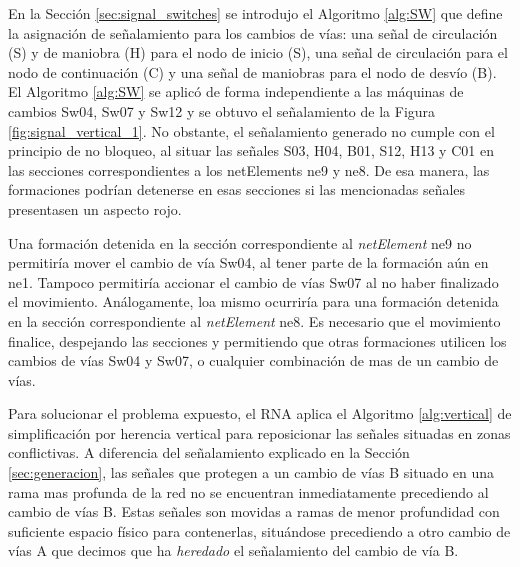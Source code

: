 	En la Sección \ref{sec:signal_switches} se introdujo el Algoritmo \ref{alg:SW} que define la asignación de señalamiento para los cambios de vías: una señal de circulación (S) y de maniobra (H) para el nodo de inicio (S), una señal de circulación para el nodo de continuación (C) y una señal de maniobras para el nodo de desvío (B). El Algoritmo \ref{alg:SW} se aplicó de forma independiente a las máquinas de cambios Sw04, Sw07 y Sw12 y se obtuvo el señalamiento de la Figura \ref{fig:signal_vertical_1}. No obstante, el señalamiento generado no cumple con el principio de no bloqueo, al situar las señales S03, H04, B01, S12, H13 y C01 en las secciones correspondientes a los netElements ne9 y ne8. De esa manera, las formaciones podrían detenerse en esas secciones si las mencionadas señales presentasen un aspecto rojo.
	
	Una formación detenida en la sección correspondiente al \textit{netElement} ne9 no permitiría mover el cambio de vía Sw04, al tener parte de la formación aún en ne1. Tampoco permitiría accionar el cambio de vías Sw07 al no haber finalizado el movimiento. Análogamente, loa mismo ocurriría para una formación detenida en la sección correspondiente al \textit{netElement} ne8. Es necesario que el movimiento finalice, despejando las secciones y permitiendo que otras formaciones utilicen los cambios de vías Sw04 y Sw07, o cualquier combinación de mas de un cambio de vías.
	
	Para solucionar el problema expuesto, el RNA aplica el Algoritmo \ref{alg:vertical} de simplificación por herencia vertical para reposicionar las señales situadas en zonas conflictivas. A diferencia del señalamiento explicado en la Sección \ref{sec:generacion}, las señales que protegen a un cambio de vías B situado en una rama mas profunda de la red no se encuentran inmediatamente precediendo al cambio de vías B. Estas señales son movidas a ramas de menor profundidad con suficiente espacio físico para contenerlas, situándose precediendo a otro cambio de vías A que decimos que ha \emph{heredado} el señalamiento del cambio de vía B.
		
